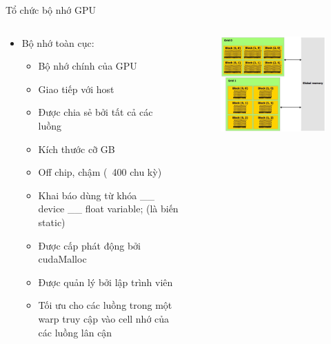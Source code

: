 \documentclass[10pt]{beamer}
\theoremstyle{remark}
\numberwithin{algocf}{section}
\numberwithin{equation}{section}
\numberwithin{dl}{section}
\numberwithin{figure}{section}
\begin{document}
\begin{frame}[shrink]{Tổ chức bộ nhớ GPU}
    \begin{columns}[onlytextwidth]
        \begin{column}{0.5\linewidth}
            \begin{itemize}
                \item Bộ nhớ toàn cục:
                \begin{itemize}
                    \item Bộ nhớ chính của GPU
                    \item Giao tiếp với host
                    \item Được chia sẻ bởi tất cả các luồng 
                    \item Kích thước cỡ GB 
                    \item Off chip, chậm (~400 chu kỳ)
                    \item Khai báo dùng từ khóa \_\_ device \_\_ float variable; (là biến static)
                    \item Được cấp phát động bởi cudaMalloc
                    \item Được quản lý bởi lập trình viên
                    \item Tối ưu cho các luồng trong một warp truy cập vào cell nhớ của các luồng lân cận
                \end{itemize}
            \end{itemize}
        \end{column}
        \begin{column}{0.5\linewidth}
            \begin{figure}[H]
                \centering
                \includegraphics[width=\linewidth]{figures/CUDA/GPU_Global_Memory.png}
            \end{figure}
        \end{column}
    \end{columns}
\end{frame}
\end{document}
